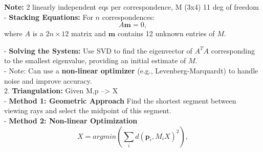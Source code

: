     \textbf{Note: }2 linearly independent eqs per correspondence, M (3x4) 11 deg of freedom\\
   - \textbf{Stacking Equations:}  For \(n\) correspondences:
      \[
       A \mathbf{m} = 0,
   \]
   where \(A\) is a \(2n \times 12\) matrix and \(\mathbf{m}\) contains 12 unknown entries of \(M\).

   - \textbf{Solving the System:} Use SVD to find the eigenvector of \(A^T A\) corresponding to the smallest eigenvalue, providing an initial estimate of \(M\). \\
  - Note: Can use a\textbf{ non-linear optimizer} (e.g., Levenberg-Marquardt) to handle noise and improve accuracy. \\

2. \textbf{Triangulation:} Given M,p --> X\\
   - \textbf{Method 1: Geometric Approach}  
     Find the shortest segment between viewing rays and select the midpoint of this segment. \\
   - \textbf{Method 2: Non-linear Optimization}  
     \[
     X = argmin (
     \sum_i d(\mathbf{p}_i, M_i X)^2 ),
     \]

